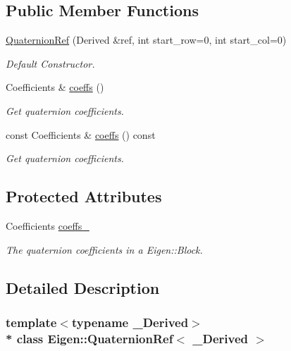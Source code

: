 \subsection*{Public Member Functions}
\begin{DoxyCompactItemize}
\item 
\hyperlink{classEigen_1_1QuaternionRef_ac34134b75ba285ae4445d250f47f4016}{Quaternion\+Ref} (Derived \&ref, int start\+\_\+row=0, int start\+\_\+col=0)
\begin{DoxyCompactList}\small\item\em Default Constructor. \end{DoxyCompactList}\item 
Coefficients \& \hyperlink{classEigen_1_1QuaternionRef_ad181c3d0f58e30e4508c10f7c6bc8c73}{coeffs} ()
\begin{DoxyCompactList}\small\item\em Get quaternion coefficients. \end{DoxyCompactList}\item 
const Coefficients \& \hyperlink{classEigen_1_1QuaternionRef_a32775ef17d906112484443a31307052f}{coeffs} () const 
\begin{DoxyCompactList}\small\item\em Get quaternion coefficients. \end{DoxyCompactList}\end{DoxyCompactItemize}
\subsection*{Protected Attributes}
\begin{DoxyCompactItemize}
\item 
Coefficients \hyperlink{classEigen_1_1QuaternionRef_a236621f8f2822fc2c9ef50069badf64f}{coeffs\+\_\+}\hypertarget{classEigen_1_1QuaternionRef_a236621f8f2822fc2c9ef50069badf64f}{}\label{classEigen_1_1QuaternionRef_a236621f8f2822fc2c9ef50069badf64f}

\begin{DoxyCompactList}\small\item\em The quaternion coefficients in a Eigen\+::\+Block. \end{DoxyCompactList}\end{DoxyCompactItemize}


\subsection{Detailed Description}
\subsubsection*{template$<$typename \+\_\+\+Derived$>$\\*
class Eigen\+::\+Quaternion\+Ref$<$ \+\_\+\+Derived $>$}

